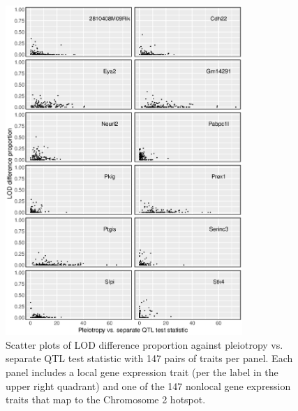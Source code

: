 \documentclass{article}
\begin{document}
\begin{boehm}
\begin{figure}
    \centering
    \includegraphics[width = 0.8\textwidth]{../Rmd/12local-facet_grid-no-strip.eps}
    \caption{Scatter plots of LOD difference proportion against pleiotropy vs. separate QTL test statistic with 147 pairs of traits per panel. Each panel includes a local gene expression trait (per the label in the upper right quadrant) and one of the 147 nonlocal gene expression traits that map to the Chromosome 2 hotspot.}
    \label{fig:nothnf4a-12}
\end{figure}







\end{boehm}
\end{document}
